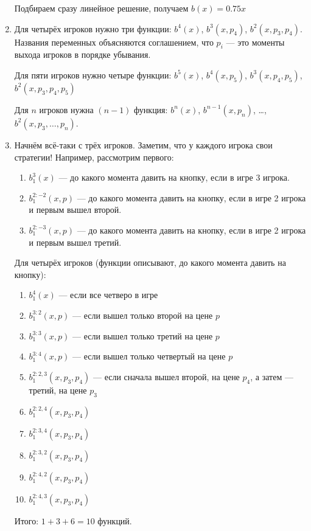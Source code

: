 \begin{enumerate}
Подбираем сразу линейное решение, получаем $ b(x)=0.75x $

\item Для четырёх игроков нужно три функции: $ b^{4}(x) $, $ b^{3}(x,p_{4}) $, $ b^{2}(x,p_{3},p_{4}) $. Названия переменных объясняются соглашением, что $ p_{i} $ — это моменты выхода игроков в порядке убывания.

Для пяти игроков нужно четыре функции: $ b^{5}(x) $, $ b^{4}(x,p_{5}) $, $ b^{3}(x,p_{4},p_{5}) $, $ b^{2}(x,p_{3},p_{4},p_{5}) $

Для $ n $ игроков нужна $ (n-1) $ функция: $ b^{n}(x) $, $ b^{n-1}(x,p_{n}) $, \ldots, $ b^{2}(x, p_{3}, \ldots, p_{n}) $.

\item Начнём всё-таки с трёх игроков. Заметим, что у каждого игрока свои стратегии! Например, рассмотрим первого:
\begin{enumerate}
\item $b_{1}^{3}(x)$ — до какого момента давить на кнопку, если в игре 3 игрока.
\item $b_{1}^{2:-2}(x,p) $ — до какого момента давить на кнопку, если в игре 2 игрока и первым вышел второй.
\item $b_{1}^{2:-3}(x,p) $ — до какого момента давить на кнопку, если в игре 2 игрока и первым вышел третий.
\end{enumerate}

Для четырёх игроков (функции описывают, до какого момента давить на кнопку):
\begin{enumerate}
\item $b_{1}^{4}(x)$ — если все четверо в игре
\item $b_{1}^{3:2}(x,p) $ — если вышел только второй на цене $ p $
\item $b_{1}^{3:3}(x,p) $ — если вышел только третий на цене $ p $
\item $b_{1}^{3:4}(x,p) $ — если вышел только четвертый на цене $ p $

\item $b_{1}^{2:2,3}(x,p_{3},p_{4}) $ — если сначала вышел второй, на цене $ p_{4} $, а затем — третий, на цене $ p_{3} $
\item $b_{1}^{2:2,4}(x,p_{3},p_{4}) $
\item $b_{1}^{2:3,4}(x,p_{3},p_{4}) $
\item $b_{1}^{2:3,2}(x,p_{3},p_{4}) $
\item $b_{1}^{2:4,2}(x,p_{3},p_{4}) $
\item $b_{1}^{2:4,3}(x,p_{3},p_{4}) $
\end{enumerate}
Итого: $1+3+6=10$ функций.


\end{enumerate}

